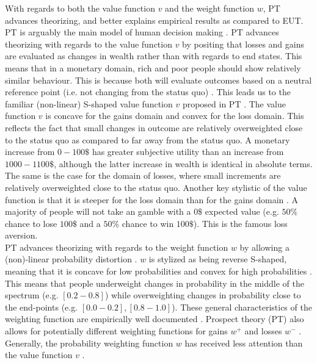 \documentclass[12pt]{article}
\begin{document}
With regards to both the value function $v$ and
the weight function $w$,
PT \autocite{
	PT,
tversky1992advances} advances theorizing,
and better explains empirical results
\autocite{abdellaoui2010separating,
wu1996curvature} as compared to EUT.
PT is arguably the main model of human decision making
\autocite{newell2015straight}.
PT advances theorizing
with regards to the value function $v$
by positing that losses and
gains are evaluated as changes in wealth rather
than with regards to end states. This means that
in a monetary domain, rich and poor people
should show relatively similar
behaviour. This is because both will
evaluate outcomes based
on a neutral reference point (i.e. not
changing from the status quo)
\autocite{newell2015straight,
abdellaoui2010separating}.
This leads us to the familiar (non-linear) S-shaped
value function $v$ proposed in PT \autocite{PT}.
The value function $v$ is concave for the gains
domain and convex for the loss domain.
This reflects the
fact that small changes in outcome are relatively
overweighted close to the status quo as
compared to far away from the status quo.
A monetary increase from
$0 - 100\$$ has greater subjective utility
than an increase
from $1000 - 1100\$$, although the latter
increase in wealth is identical in absolute terms.
The same is the case for the
domain of losses, where small increments are
relatively overweighted close to the
status quo. Another key stylistic of the
value function is that it is steeper for the
loss domain than for the gains domain
\autocite{newell2015straight}.
A majority of people will not take an gamble
with a $0\$$ expected value (e.g.  $50\%$ chance
to lose  $100\$$ and a  $50\%$ chance to win
$100\$$). This is the famous loss aversion. \\

PT advances theorizing with regards to
the weight function $w$
by allowing a (non)-linear probability
distortion \autocite{PT,
gonzalez1999shape}. $w$ is stylized as
being reverse S-shaped, meaning that it is
concave for low probabilities and convex for
high probabilities \autocite{gonzalez1999shape,
wu1996curvature}.
This means that
people underweight changes in probability in
the middle of the spectrum (e.g. $[0.2-0.8]$)
while overweighting changes in probability close
to the end-points (e.g. $[0.0 - 0.2], [0.8 - 1.0]$).
These general characteristics of the weighting
function are empirically well documented
\autocite{tversky1992advances,
wu1996curvature,
abdellaoui2010separating}.
Prospect theory (PT) also allows for potentially
different weighting functions for gains $w^{+}$
and losses  $w^{-}$ \autocite{abdellaoui2010separating}.
Generally, the probability weighting function $w$
has received less attention than the value function
$v$ \autocite{gonzalez1999shape}.
\end{document}
